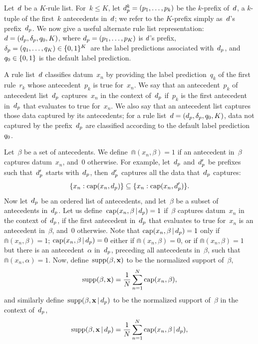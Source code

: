 Let~${d}$ be a $K$-rule list.
%
For~$k \le K$, let ${{d}_p^k = (p_1, \dots, p_k)}$ be the $k$-prefix of~${d}$,
a $k$-tuple of the first~$k$ antecedents in~${d}$;
we refer to the $K$-prefix simply as~${d}$'s prefix~$d_p$.
%
%
We now give a useful alternate rule list representation:
${{d} = (d_p, \delta_p, q_0, K)}$,
where ${d_p = (p_1, \dots, p_K)}$ is ${d}$'s prefix,
${\delta_p = (q_1, \dots, q_K) \in \{0, 1\}^K}$~are the label predictions associated
with~$d_p$, and~${q_0 \in \{0, 1\}}$ is the default label prediction.

A rule list~${d}$ classifies datum~$x_n$ by providing the label prediction~$q_k$
of the first rule~$r_k$ whose antecedent~$p_k$ is true for~$x_n$.
%
We say that an antecedent~$p_k$ of antecedent list~$d_p$ captures~$x_n$
in the context of~$d_p$ if~$p_k$ is the first antecedent in~$d_p$ that
evaluates to true for~$x_n$.
%
We also say that an antecedent list captures those data captured by its antecedents;
for a rule list~${{d} = (d_p, \delta_p, q_0, K)}$,
data not captured by the prefix~$d_p$
are classified according to the default label prediction~$q_0$.

Let~$\beta$ be a set of antecedents.
%
We define~${\Cap(x_n, \beta) = 1}$ if an antecedent in~$\beta$
captures datum~$x_n$, and~0 otherwise.
%
For example, let~$d_p$ and~$d_p'$ be prefixes such that~$d_p'$ starts
with~$d_p$, then~$d_p'$ captures all the data that~$d_p$ captures:
\begin{align}
\{x_n: \Cap(x_n, \Prefix)\} \subseteq \{x_n: \Cap(x_n, \Prefix')\}.
\label{eq:cap-subset}
\end{align}
%
Now let~$d_p$ be an ordered list of antecedents,
and let~$\beta$ be a subset of antecedents in~$d_p$.
%
Let us define~${\textnormal{cap}(x_n, \beta \,|\, d_p) = 1}$ if~$\beta$
captures datum~$x_n$ in the context of~$d_p$,
\ie if the first antecedent in~$d_p$ that evaluates to true for~$x_n$
is an antecedent in~$\beta$,
and~0 otherwise.
%
Note that ${\textnormal{cap}(x_n, \beta \,|\, d_p) = 1}$ only if ${\Cap(x_n, \beta) = 1}$;
${\textnormal{cap}(x_n, \beta \,|\, d_p) = 0}$ either if ${\Cap(x_n, \beta) = 0}$,
or if ${\Cap(x_n, \beta) = 1}$ but there is an antecedent~$\alpha$ in~$d_p$,
preceding all antecedents in~$\beta$, such that ${\Cap(x_n, \alpha) = 1}$.
%
Now, define~${\textnormal{supp}(\beta, \mathbf{x})}$ to be the normalized support of~$\beta$,
\begin{align}
\Supp(\beta, \x) = \frac{1}{N} \sum_{n=1}^N \Cap(x_n, \beta),
\label{eq:support}
\end{align}
and similarly define~${\textnormal{supp}(\beta, \mathbf{x} \,|\, d_p)}$
to be the normalized support of~$\beta$ in the context of~$d_p$,
\begin{align}
\Supp(\beta, \x \given \Prefix) = \frac{1}{N} \sum_{n=1}^N \Cap(x_n, \beta \given \Prefix),
\end{align}

